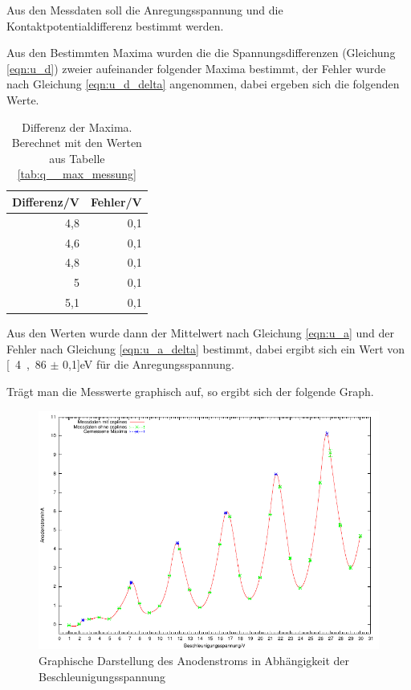 \documentclass[12pt,a4paper]{article}
\begin{document}
Aus den Messdaten soll die Anregungsspannung und die Kontaktpotentialdifferenz bestimmt werden.

Aus den Bestimmten Maxima wurden die die Spannungsdifferenzen (Gleichung \ref{eqn:u_d}) zweier aufeinander folgender Maxima bestimmt, der Fehler wurde nach Gleichung \ref{eqn:u_d_delta} angenommen, dabei ergeben sich die folgenden Werte.

\begin{table}[H]
\caption{Differenz der Maxima. Berechnet mit den Werten aus Tabelle \ref{tab:q__max_messung} }
\begin{center}
\begin{tabular}{|r|r|}
\hline
\multicolumn{1}{|l|}{Differenz/V} & \multicolumn{1}{l|}{Fehler/V} \\ \hline
4,8 & 0,1 \\ \hline
4,6 & 0,1 \\ \hline
4,8 & 0,1 \\ \hline
5 & 0,1 \\ \hline
5,1 & 0,1 \\ \hline
\end{tabular}
\end{center}
\label{tab:q__diff}
\end{table}

Aus den Werten wurde dann der Mittelwert nach Gleichung \ref{eqn:u_a} und der Fehler nach Gleichung \ref{eqn:u_a_delta} bestimmt, dabei ergibt sich ein Wert von \unit[4,86 $\pm$ 0,1]{eV} für die Anregungsspannung.

Trägt man die Messwerte graphisch auf, so ergibt sich der folgende Graph.

\begin{figure}[H]
	\centering
	\includegraphics[scale= 1.5]{q_t.pdf}
	\caption{Graphische Darstellung des Anodenstroms in Abhängigkeit der Beschleunigungsspannung}
\end{figure}
\end{document}
